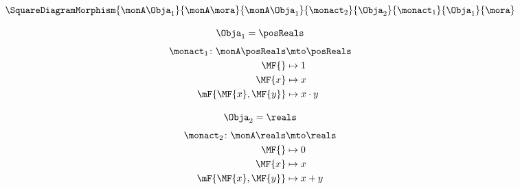 {\begin{forslides}
        \begin{equation}\label{eq:formal-algebra-morphism-square-domain}
            \SquareDiagramMorphism{
                \monA \Obja_1
            }{
                \monA \mora
            }{
                \monA \Obja_1
            }{
                \monact_2
            }{
                \Obja_2
            }{
                \monact_1
            }{
                \Obja_1
            }{
                \mora
            }
        \end{equation}

        \begin{equation}\label{eq:formal-algebra-morphism-square-1-x}
            \Obja_1 = \posReals
        \end{equation}
        \begin{equation}\label{eq:formal-algebra-morphism-square-1-a}
            \begin{aligned}
                \monact_1 \colon \monA \posReals & \mto \posReals \\
                \MF{}                            & \mapsto 1 \\
                \MF{x}                           & \mapsto x \\
                \mF{\MF{x}, \MF{y}}              & \mapsto x \cdot y
            \end{aligned}
        \end{equation}

        \begin{equation}\label{eq:formal-algebra-morphism-square-2-x}
            \Obja_2 = \reals
        \end{equation}
        \begin{equation}\label{eq:formal-algebra-morphism-square-2-a}
            \begin{aligned}
                \monact_2 \colon \monA \reals & \mto \reals \\
                \MF{}                         & \mapsto 0 \\
                \MF{x}                        & \mapsto x \\
                \mF{\MF{x}, \MF{y}}           & \mapsto x + y
            \end{aligned}
        \end{equation}


\end{forslides}}

